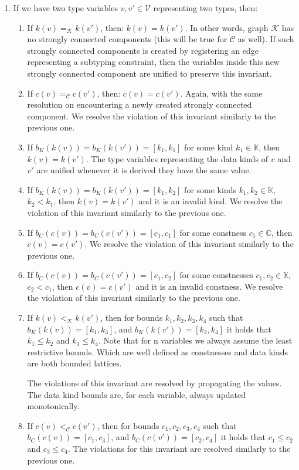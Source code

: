 \begin{enumerate}
    \item \label{invG} If we have two type variables $v, v' \in \mathcal{V}$ representing two types, then:
        \begin{enumerate}
            \item If $k (v) =_{\mathcal{K}} k (v')$, then: $k (v) = k(v')$. In other words, graph $\mathcal{K}$ has no strongly connected components (this will be true for $\mathcal{C}$ as well). If such strongly connected components is created by registering an edge representing a subtyping constraint, then the variables inside this new strongly connected component are unified to preserve this invariant.
            \item If $c (v) =_{\mathcal{C}} c (v')$, then: $c (v) = c(v')$. Again, with the same resolution on encountering a newly created strongly connected component. We resolve the violation of this invariant similarly to the previous one.
            \item If $b_K (k (v)) = b_K (k (v')) = [k_1, k_1]$ for some kind $k_1 \in \mathbb{K}$, then $k (v) = k (v')$. The type variables representing the data kinds of $v$ and $v'$ are unified whenever it is derived they have the same value.
            \item If $b_K (k (v)) = b_K (k (v')) = [k_1, k_2]$ for some kinds $k_1, k_2 \in \mathbb{K}$, $k_2 < k_1$, then $k (v) = k (v')$ and it is an invalid kind. We resolve the violation of this invariant similarly to the previous one.
            \item If $b_C (c (v)) = b_C (c (v')) = [c_1, c_1]$ for some constness $c_1 \in \mathbb{C}$, then $c (v) = c (v')$. We resolve the violation of this invariant similarly to the previous one.
            \item If $b_C (c (v)) = b_C (c (v')) = [c_1, c_2]$ for some constnesses $c_1, c_2 \in \mathbb{K}$, $c_2 < c_1$, then $c (v) = c (v')$ and it is an invalid constness. We resolve the violation of this invariant similarly to the previous one.
            \item If $k (v) <_{\mathcal{K}} k (v')$, then for bounds $k_1, k_2, k_3, k_4$ such that $b_K (k (v)) = [k_1, k_3]$, and $b_K (k (v')) = [k_2, k_4]$ it holds that $k_1 \leq k_2$ and $k_3 \leq k_4$. Note that for n variables we always assume the least restrictive bounds. Which are well defined as constnesses and data kinds are both bounded lattices.

            The violations of this invariant are resolved by propagating the values. The data kind bounds are, for each variable, always updated monotonically.
            \item If $c (v) <_{\mathcal{C}} c (v')$, then for bounds $c_1, c_2, c_3, c_4$ such that $b_C (c (v)) = [c_1, c_3]$, and $b_C (c (v')) = [c_2, c_4]$ it holds that $c_1 \leq c_2$ and $c_3 \leq c_4$. The violations for this invariant are resolved similarly to the previous one.
        \end{enumerate}



\end{enumerate}
